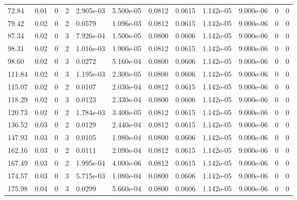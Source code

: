 \documentclass[preview]{standalone}
\begin{document}
{{\begin{tabular}{L{1.2cm}C{1.2cm} C{0.3cm}C{0.5cm} C{1.4cm}C{1.4cm} C{1.4cm}C{1.4cm} C{1.6cm}C{1.6cm} C{1.6cm}C{1.6cm}}
  72.84  &  0.01  & 0     &  2 &  2.905e-03  & 5.500e-05  &  0.0812&   0.0615& 1.142e-05 & 9.000e-06   &  0 & 0  \\ 
  79.42  &  0.02  & 0     &  2 &  0.0579  & 1.096e-03  &  0.0812&   0.0615& 1.142e-05 & 9.000e-06   &  0 & 0  \\ 
  87.34  &  0.02  & 0     &  3 &  7.926e-04  & 1.500e-05  &  0.0800&   0.0606& 1.142e-05 & 9.000e-06   &  0 & 0  \\ 
  98.31  &  0.02  & 0     &  2 &  1.016e-03  & 1.900e-05  &  0.0812&   0.0615& 1.142e-05 & 9.000e-06   &  0 & 0  \\ 
  98.60  &  0.02  & 0     &  3 &  0.0272  & 5.160e-04  &  0.0800&   0.0606& 1.142e-05 & 9.000e-06   &  0 & 0  \\ 
  111.84  &  0.02  & 0     &  3 &  1.195e-03  & 2.300e-05  &  0.0800&   0.0606& 1.142e-05 & 9.000e-06   &  0 & 0  \\ 
  115.07  &  0.02  & 0     &  2 &  0.0107  & 2.030e-04  &  0.0812&   0.0615& 1.142e-05 & 9.000e-06   &  0 & 0  \\ 
  118.29  &  0.02  & 0     &  3 &  0.0123  & 2.330e-04  &  0.0800&   0.0606& 1.142e-05 & 9.000e-06   &  0 & 0  \\ 
  120.73  &  0.02  & 0     &  2 &  1.784e-03  & 3.400e-05  &  0.0812&   0.0615& 1.142e-05 & 9.000e-06   &  0 & 0  \\ 
  136.52  &  0.03  & 0     &  2 &  0.0129  & 2.440e-04  &  0.0812&   0.0615& 1.142e-05 & 9.000e-06   &  0 & 0  \\ 
  147.93  &  0.03  & 0     &  3 &  0.0105  & 1.980e-04  &  0.0800&   0.0606& 1.142e-05 & 9.000e-06   &  0 & 0  \\ 
  162.16  &  0.03  & 0     &  2 &  0.0111  & 2.090e-04  &  0.0812&   0.0615& 1.142e-05 & 9.000e-06   &  0 & 0  \\ 
  167.49  &  0.03  & 0     &  2 &  1.995e-04  & 4.000e-06  &  0.0812&   0.0615& 1.142e-05 & 9.000e-06   &  0 & 0  \\ 
  174.57  &  0.03  & 0     &  3 &  5.715e-03  & 1.080e-04  &  0.0800&   0.0606& 1.142e-05 & 9.000e-06   &  0 & 0  \\ 
  175.98  &  0.04  & 0     &  3 &  0.0299  & 5.660e-04  &  0.0800&   0.0606& 1.142e-05 & 9.000e-06   &  0 & 0  \\ 
\hline 
\end{tabular} 

}}
\end{document}
